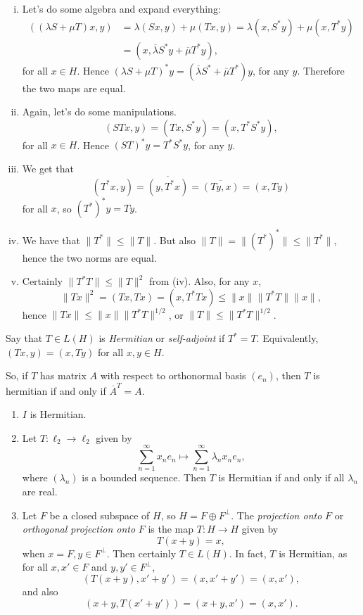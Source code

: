 \documentclass[12pt]{article}
\begin{document}
\begin{proofbox}


	\begin{enumerate}[(i)]
		\item Let's do some algebra and expand everything:
			\begin{align*}
				((\lambda S + \mu T)x, y) &=  \lambda(Sx, y) + \mu(Tx, y) = \lambda(x, S^{\ast} y) + \mu(x, T^{\ast} y) \\
							  &= (x, \overline{\lambda} S^{\ast} y + \overline{\mu} T^{\ast} y),
			\end{align*}
			for all $x \in H$. Hence $(\lambda S + \mu T)^{\ast} y = (\overline{\lambda} S^{\ast} + \overline{\mu} T^{\ast})y$, for any $y$. Therefore the two maps are equal.
		\item Again, let's do some manipulations.
			\[
				(STx, y) = (Tx, S^{\ast} y) = (x, T^{\ast} S^{\ast} y),
			\]
			for all $x \in H$. Hence $(ST)^{\ast} y = T^{\ast} S^{\ast} y$, for any $y$.
		\item We get that
			\[
				(T^{\ast} x, y) = \overline{(y, T^{\ast} x)} = \overline{(Ty, x)} = (x, Ty)
			\]
			for all $x$, so $(T^{\ast})^{\ast}y = Ty$.
		\item We have that $\|T^{\ast}\| \leq \|T\|$. But also $\|T\| = \|(T^{\ast})^{\ast}\| \leq \|T^{\ast}\|$, hence the two norms are equal.
		\item Certainly $\|T^{\ast}T\| \leq \|T\|^2$ from (iv). Also, for any $x$,
			\[
			\|Tx\|^2 = (Tx, Tx) = (x, T^{\ast} T x) \leq \|x\| \|T^{\ast}T\| \|x\|,
			\]
			hence $\|Tx\| \leq \|x\| \|T^{\ast}T\|^{1/2}$, or $\|T\| \leq \|T^{\ast}T\|^{1/2}$.
	\end{enumerate}
\end{proofbox}

Say that $T \in L(H)$ is \emph{Hermitian} or \emph{self-adjoint} if $T^{\ast} = T$. Equivalently, $(Tx, y) = (x, Ty)$ for all $x, y \in H$.

So, if $T$ has matrix $A$ with respect to orthonormal basis $(e_n)$, then $T$ is hermitian if and only if $\overline{A}^{T} = A$.

\begin{exbox}
\begin{enumerate}
	\item $I$ is Hermitian.
	\item Let $T : \ell_2 \to \ell_2$ given by
		\[
		\sum_{n = 1}^{\infty} x_n e_n \mapsto \sum_{n = 1}^{\infty} \lambda_n x_n e_n,
		\]
		where $(\lambda_n)$ is a bounded sequence. Then $T$ is Hermitian if and only if all $\lambda_n$ are real.
	\item Let $F$ be a closed subspace of $H$, so $H = F \oplus F^{\perp}$. The \emph{projection onto} $F$ or \emph{orthogonal projection onto} $F$ is the map $T : H \to H$ given by
		\[
			T(x+y) = x,
		\]
		when $x = F, y \in F^{\perp}$. Then certainly $T \in L(H)$. In fact, $T$ is Hermitian, as for all $x, x' \in F$ and $y, y' \in F^{\perp}$,
		\[
			(T(x+y), x' + y') = (x, x' + y') = (x, x'),
		\]
		and also
		\[
			(x+y, T(x'+y')) = (x+y, x') = (x, x').
		\]
\end{enumerate}
\end{exbox}
\end{document}
